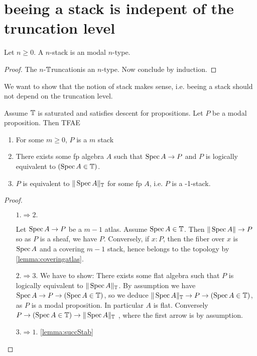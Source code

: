 \documentclass{article}
\newcommand{\truncation}{$\bT$runcation}
\newcommand{\red}[1]{{\color{red} #1}}
\begin{document}
\section{ beeing a stack is indepent of the truncation level}


\begin{lemma}
    Let $n \ge 0$. A  $n$-stack is an modal $n$-type.
\end{lemma}
\begin{proof}
     The $n$-\truncation is an $n$-type. Now conclude by induction.
\end{proof}
We want to show that the notion of  stack makes sense, i.e. beeing a stack should not depend on the truncation level. 

\begin{lemma}{\label{lemma:prop0stacks}}
     Assume $\mathbb{T}$ is saturated and satisfies descent for propositions. Let $P$ be a modal proposition. Then TFAE 
     \begin{enumerate}
         \item For some $m \ge 0$, $P$ is a  $m$ stack 

         \item There exists some fp algebra $A$ such that $\operatorname{Spec} A \to P$ and $P$ is logically equivalent to $(\operatorname{Spec} A \in \mathbb{T})$.
         \item $P$ is equivalent to $\| \operatorname{Spec} A \|_{\mathbb{T}}$ for some fp $A$, i.e. $P$ is a  -1-stack.
     \end{enumerate}
     
     
\end{lemma}
\begin{proof}
\
    \begin{itemize}
        \item[$1.\Rightarrow 2.$]
    
     Let $\operatorname{Spec} A \to P$ be a $m-1$ atlas. Assume $\operatorname{Spec} A \in \mathbb{T}$. Then $\|\operatorname{Spec} A\| \to P$ so as $P$ is a sheaf, we have $P$. Conversely, if $x : P$, then the fiber over $x$ is $\operatorname{Spec} A$ and a covering $m-1$ stack, hence belongs to the topology by \ref{lemma:coveringatlas}. 
     \item[$2. \Rightarrow 3.$]
        \red{We have to show: There exists some flat algebra such that $P$ is logically equivalent to $\|\operatorname{Spec} A\|_{\mathbb{T}}$. }        
        By assumption we have $\operatorname{Spec} A \to P \to (\operatorname{Spec} A \in \mathbb{T})$, so we deduce 
        $\| \operatorname{Spec} A\|_{\mathbb{T}} \to P \to (\operatorname{Spec} A \in \mathbb{T})$, as $P$ is a modal proposition. In particular $A$ is flat. Conversely $P \to (\operatorname{Spec} A \in \mathbb{T}) \to \|\operatorname{Spec} A\|_{\mathbb{T}}$ , where the first arrow is by assumption.
        \item [$3. \Rightarrow 1.$] \ref{lemma:succStab}
     \end{itemize}
\end{proof}
\end{document}

